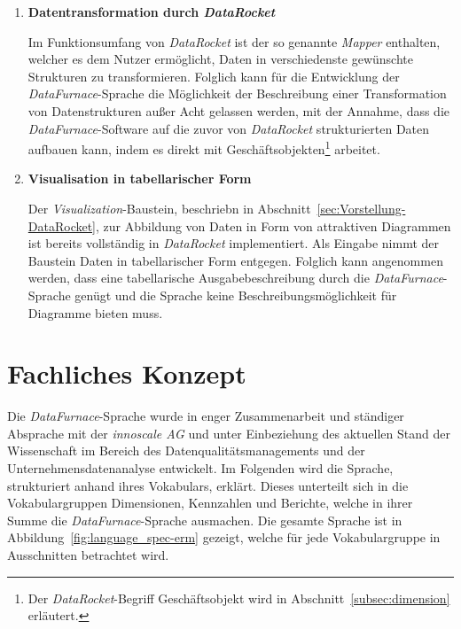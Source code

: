 \documentclass[
  language=german, %
  type=bachelor,%
  ngerman
]{isthesis}
\begin{document}
\begin{content}
  \begin{enumerate}
    \item \textbf{Datentransformation durch \textit{DataRocket}}

      Im Funktionsumfang von \textit{DataRocket} ist der so genannte
      \textit{Mapper} enthalten, welcher es dem Nutzer ermöglicht, Daten in
      verschiedenste gewünschte Strukturen zu transformieren. Folglich kann für
      die Entwicklung der \textit{DataFurnace}-Sprache die Möglichkeit der
      Beschreibung einer Transformation von Datenstrukturen außer Acht gelassen
      werden, mit der Annahme, dass die \textit{DataFurnace}-Software auf die
      zuvor von \textit{DataRocket} strukturierten Daten aufbauen kann, indem
      es direkt mit Geschäftsobjekten\footnote{Der \textit{DataRocket}-Begriff
      Geschäftsobjekt wird in Abschnitt~\ref{subsec:dimension} erläutert.}
      arbeitet.

			\item \textbf{Visualisation in tabellarischer Form}

			Der \textit{Visualization}-Baustein, beschriebn in
			Abschnitt~\ref{sec:Vorstellung-DataRocket}, zur Abbildung von Daten in
			Form von attraktiven Diagrammen ist bereits vollständig in
			\textit{DataRocket} implementiert. Als Eingabe nimmt der Baustein Daten
			in tabellarischer Form entgegen. Folglich kann angenommen werden, dass
			eine tabellarische Ausgabebeschreibung durch die
			\textit{DataFurnace}-Sprache genügt und die Sprache keine
			Beschreibungsmöglichkeit für Diagramme bieten muss.



  \end{enumerate}


  \section{Fachliches Konzept}\label{sec:sprache/fachliches-konzept}

  Die \textit{DataFurnace}-Sprache wurde in enger Zusammenarbeit und ständiger
  Absprache mit der \textit{innoscale AG} und unter Einbeziehung des
  aktuellen Stand der Wissenschaft im Bereich des Datenqualitätsmanagements und
  der Unternehmensdatenanalyse entwickelt. Im Folgenden wird die Sprache,
  strukturiert anhand ihres Vokabulars, erklärt. Dieses unterteilt sich in die
  Vokabulargruppen Dimensionen, Kennzahlen und Berichte, welche in ihrer Summe
  die \textit{DataFurnace}-Sprache ausmachen. Die gesamte Sprache ist in
  Abbildung~\ref{fig:language_spec-erm} gezeigt, welche für jede
  Vokabulargruppe in Ausschnitten betrachtet wird.


\end{content}
\end{document}
